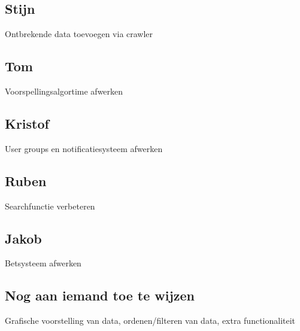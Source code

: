 \documentclass[11pt, a4paper]{article}
\begin{document}
\subsection{Stijn}
Ontbrekende data toevoegen via crawler
\subsection{Tom}
Voorspellingsalgortime afwerken
\subsection{Kristof}
User groups en notificatiesysteem afwerken
\subsection{Ruben}
Searchfunctie verbeteren
\subsection{Jakob}
Betsysteem afwerken
\subsection{Nog aan iemand toe te wijzen}
Grafische voorstelling van data, ordenen/filteren van data, extra functionaliteit
\end{document}
